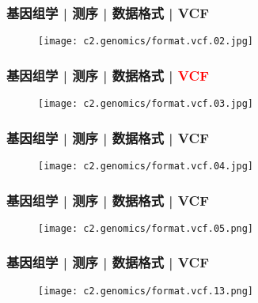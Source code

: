 \begin{frame}
  \frametitle{基因组学 | 测序 | 数据格式 | VCF}
  \begin{figure}
    \centering
    \texttt{[image: c2.genomics/format.vcf.02.jpg]}
  \end{figure}
\end{frame}
    
\begin{frame}
  \frametitle{基因组学 | 测序 | 数据格式 | \textcolor{red}{VCF}}
  \begin{figure}
    \centering
    \texttt{[image: c2.genomics/format.vcf.03.jpg]}
  \end{figure}
\end{frame}

\begin{frame}
  \frametitle{基因组学 | 测序 | 数据格式 | VCF}
  \begin{figure}
    \centering
    \texttt{[image: c2.genomics/format.vcf.04.jpg]}
  \end{figure}
\end{frame}
    
\begin{frame}
  \frametitle{基因组学 | 测序 | 数据格式 | VCF}
  \begin{figure}
    \centering
    \texttt{[image: c2.genomics/format.vcf.05.png]}
  \end{figure}
\end{frame}
    
\begin{frame}
  \frametitle{基因组学 | 测序 | 数据格式 | VCF}
  \begin{figure}
    \centering
    \texttt{[image: c2.genomics/format.vcf.13.png]}
  \end{figure}
\end{frame}
    
